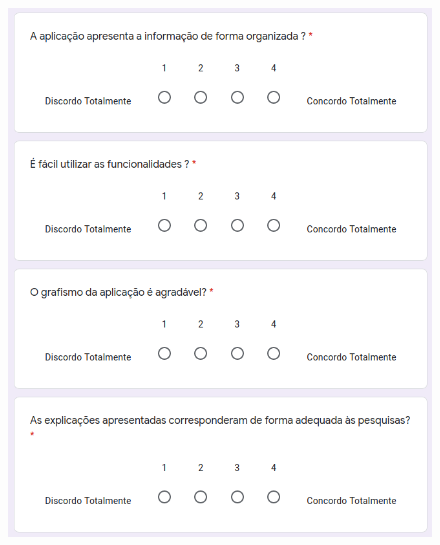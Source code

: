 \begin{figure}[H]
    \centering
    \includegraphics[scale=0.7]{appendices/assets/survey2.png}
    \label{fig:survey1}
\end{figure}

